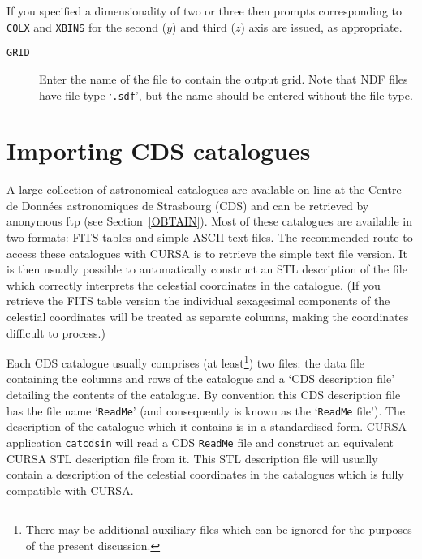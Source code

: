 \documentclass[twoside,11pt]{starlink}
\begin{document}
If you specified a dimensionality of two or three then prompts
corresponding to \texttt{COLX} and \texttt{XBINS} for the second ($y$\/)
and third ($z$\/) axis are issued, as appropriate.

\begin{description}

  \item[ \texttt{GRID} ] Enter the name of the file to contain the output
   grid.  Note that NDF files have file type `\texttt{.sdf}', but the
   name should be entered without the file type.

\end{description}


\section{\label{CDSIN}Importing CDS catalogues}

A large collection of astronomical catalogues are available on-line
at the Centre de Donn\'{e}es astronomiques de Strasbourg (CDS)
and can be retrieved by anonymous ftp (see Section~\ref{OBTAIN}).
Most of these catalogues are available in two formats: FITS tables
and simple ASCII text files.  The recommended route to access these
catalogues with CURSA is to retrieve the simple text file version.
It is then usually possible to automatically construct an STL description
of the file which correctly interprets the celestial coordinates in
the catalogue.  (If you retrieve the FITS table version the individual
sexagesimal components of the celestial coordinates will be treated as
separate columns, making the coordinates difficult to process.)

Each CDS catalogue usually comprises (at least\footnote{There may
be additional auxiliary files which can be ignored for the purposes
of the present discussion.}) two files: the data file containing the
columns and rows of the catalogue and a `CDS description file'
detailing the contents of the catalogue.  By convention this CDS
description file has the file name `\texttt{ReadMe}' (and consequently
is known as the `\texttt{ReadMe} file').  The description of the catalogue
which it contains is in a standardised form.  CURSA application \texttt{catcdsin} will read a CDS \texttt{ReadMe} file and construct an equivalent
CURSA STL description file from it.  This STL description file will
usually contain a description of the celestial coordinates in the
catalogues which is fully compatible with CURSA.
\end{document}
